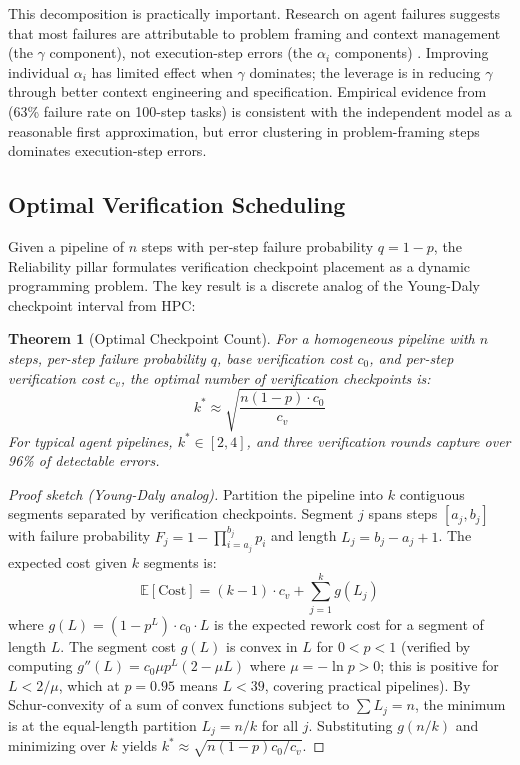 \documentclass[11pt, a4paper, logo, copyright]{googledeepmind}
\newtheorem{theorem}{Theorem}[section]
\begin{document}
This decomposition is practically important. Research on agent failures suggests that most failures are attributable to problem framing and context management (the $\gamma$ component), not execution-step errors (the $\alpha_i$ components) \citep{cemri2025multiagent}. Improving individual $\alpha_i$ has limited effect when $\gamma$ dominates; the leverage is in reducing $\gamma$ through better context engineering and specification. Empirical evidence from \citet{hariharan2025plan} (63\% failure rate on 100-step tasks) is consistent with the independent model as a reasonable first approximation, but error clustering in problem-framing steps dominates execution-step errors.

\subsection{Optimal Verification Scheduling}

Given a pipeline of $n$ steps with per-step failure probability $q = 1 - p$, the Reliability pillar formulates verification checkpoint placement as a dynamic programming problem. The key result is a discrete analog of the Young-Daly checkpoint interval from HPC:

\begin{theorem}[Optimal Checkpoint Count]
\label{thm:checkpoint}
For a homogeneous pipeline with $n$ steps, per-step failure probability $q$, base verification cost $c_0$, and per-step verification cost $c_v$, the optimal number of verification checkpoints is:
\begin{equation}
    k^* \approx \sqrt{\frac{n(1-p) \cdot c_0}{c_v}}
\end{equation}
For typical agent pipelines, $k^* \in [2, 4]$, and three verification rounds capture over 96\% of detectable errors.
\end{theorem}

\begin{proof}[Proof sketch (Young-Daly analog)]
Partition the pipeline into $k$ contiguous segments separated by verification checkpoints. Segment $j$ spans steps $[a_j, b_j]$ with failure probability $F_j = 1 - \prod_{i=a_j}^{b_j} p_i$ and length $L_j = b_j - a_j + 1$. The expected cost given $k$ segments is:
\[
    \mathbb{E}[\text{Cost}] = (k-1) \cdot c_v + \sum_{j=1}^{k} g(L_j)
\]
where $g(L) = (1 - p^L) \cdot c_0 \cdot L$ is the expected rework cost for a segment of length $L$. The segment cost $g(L)$ is convex in $L$ for $0 < p < 1$ (verified by computing $g''(L) = c_0 \mu p^L(2 - \mu L)$ where $\mu = -\ln p > 0$; this is positive for $L < 2/\mu$, which at $p = 0.95$ means $L < 39$, covering practical pipelines). By Schur-convexity of a sum of convex functions subject to $\sum L_j = n$, the minimum is at the equal-length partition $L_j = n/k$ for all $j$. Substituting $g(n/k)$ and minimizing over $k$ yields $k^* \approx \sqrt{n(1-p)c_0/c_v}$.
\end{proof}
\end{document}
